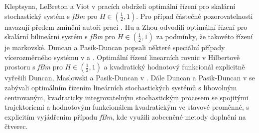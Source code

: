 
Kleptsyna, LeBreton a Viot v pracích
\cite{kleptsyna2003linear,kleptsyna2005infinite} obdrželi optimální řízení pro
skalární stochastický systém s {\em fBm} pro $H\in\left(\frac{1}{2},1\right)$.
Pro případ částečné pozorovatelnosti navazují předem zmínění autoři prací
\cite{kleptsyna2008separation}. Hu a Zhou \cite{hu2005stochastic} odvodili
optimální řízení pro skalární bilineární systém s {\em fBm} pro
$H\in\left(\frac{1}{2},1\right)$ za podmínky, že takovéto řízení je markovské.
Duncan a Pasik-Duncan popsali některé speciální případy vícerozměrného systému
v \cite{duncan2009control} a \cite{duncan2010stochastic}. Optimální řízení
linearních rovnic v Hilbertově prostoru s {\em fBm} pro
$H\in\left(\frac{1}{2},1\right)$ a kvadratický hodnotový funkcionál explicitně
vyřešili Duncan, Maslowski a Pasik-Duncan v \cite{duncan2012linear}. Dále
Duncan a Pasik-Duncan v \cite{duncan2013linear} se zabývali optimálním řízením
lineárních stochastických systémů s libovolným centrovaným, kvadraticky
integrovatelným stochastickým procesem se spojitými trajektoriemi a hodnotovým
funkcionálem kvadratickým ve stavové proměnné, s explicitím vyjádřením případu
{\em fBm}, kde využili zobecněné metody doplnění na čtverec.


